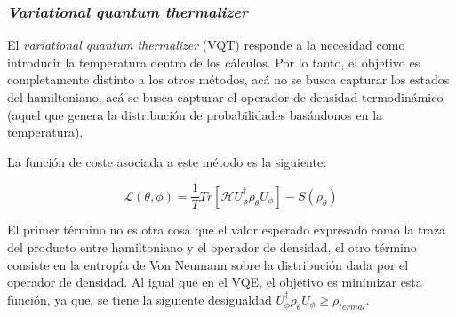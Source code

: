 \subsubsection{\textit{Variational quantum thermalizer}}
El \textit{variational quantum thermalizer} (VQT) \cite{VQT} responde a la necesidad como introducir la temperatura dentro de los cálculos. Por lo tanto, el objetivo es completamente distinto a los otros métodos, acá no se busca capturar los estados del hamiltoniano, acá se busca capturar el operador de densidad termodinámico (aquel que genera la distribución de probabilidades basándonos en la temperatura).

La función de coste asociada a este método es la siguiente:

\begin{equation*}
    \mathcal{L}(\theta, \phi) = \frac{1}{T} Tr[\mathcal{H}U^{\dag}_\phi \rho_\theta U_\phi] - S(\rho_\theta)
\end{equation*}

El primer término no es otra cosa que el valor esperado expresado como la traza del producto entre hamiltoniano y el operador de densidad, el otro término consiste en la entropía de Von Neumann sobre la distribución dada por el operador de densidad. Al igual que en el VQE, el objetivo es minimizar esta función, ya que, se tiene la siguiente desigualdad $U^{\dag}_\phi \rho_\theta U_\phi \geq \rho_{termal}$.

